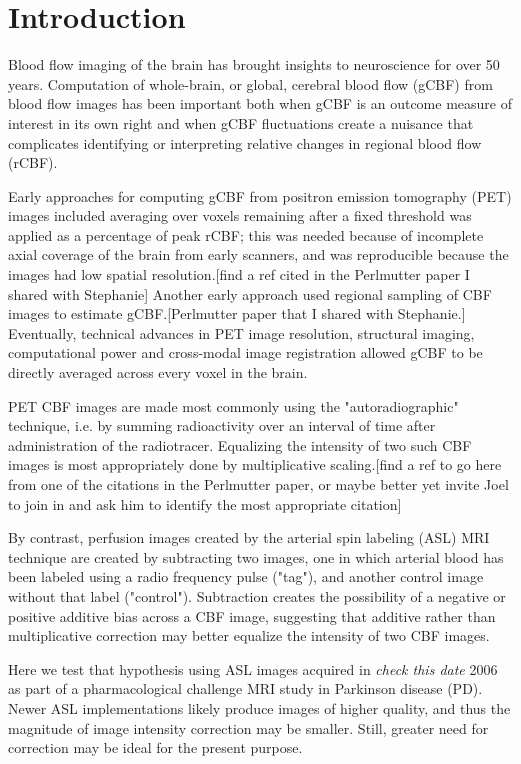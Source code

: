 \section{Introduction}
Blood flow imaging of the brain has brought insights to neuroscience for over 50 years.\cite{Taber_2005} Computation of whole-brain, or global, cerebral blood flow (gCBF) from blood flow images has been important both when gCBF is an outcome measure of interest in its own right and when gCBF fluctuations create a nuisance that complicates identifying or interpreting relative changes in regional blood flow (rCBF). 

Early approaches for computing gCBF from positron emission tomography (PET) images included averaging over voxels remaining after a fixed threshold was applied as a percentage of peak rCBF; this was needed because of incomplete axial coverage of the brain from early scanners, and was reproducible because the images had low spatial resolution.[find a ref cited in the Perlmutter paper I shared with Stephanie] Another early approach used regional sampling of CBF images to estimate gCBF.[Perlmutter paper that I shared with Stephanie.] Eventually, technical advances in PET image resolution, structural imaging, computational power and cross-modal image registration allowed gCBF to be directly averaged across every voxel in the brain.

PET CBF images are made most commonly using the "autoradiographic" technique, i.e. by summing radioactivity over an interval of time after administration of the radiotracer. Equalizing the intensity of two such CBF images is most appropriately done by multiplicative scaling.[find a ref to go here from one of the citations in the Perlmutter paper, or maybe better yet invite Joel to join in and ask him to identify the most appropriate citation] 

By contrast, perfusion images created by the arterial spin labeling (ASL) MRI technique are created by subtracting two images, one in which arterial blood has been labeled using a radio frequency pulse ("tag"), and another control image without that label ("control"). Subtraction creates the possibility of a negative or positive additive bias across a CBF image, suggesting that additive rather than multiplicative correction may better equalize the intensity of two CBF images.

Here we test that hypothesis using ASL images acquired in \textit{check this date} 2006 as part of a pharmacological challenge MRI study in Parkinson disease (PD). Newer ASL implementations likely produce images of higher quality, and thus the magnitude of image intensity correction may be smaller. Still, greater need for correction may be ideal for the present purpose.